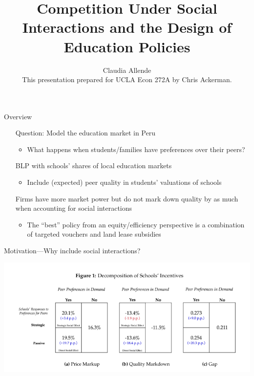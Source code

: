 \documentclass[dvipsnames]{beamer}
\title{Competition Under Social Interactions and the Design of Education Policies}
\author{Claudia Allende \\[2em] \small{This presentation prepared for UCLA Econ 272A by Chris Ackerman.}}
\begin{document}
\maketitle

\begin{frame}{Overview}
  \begin{itemize}
  \item[Question:] Model the education market in Peru 
    \begin{itemize}
    \item What happens when students/families have preferences over their peers?
    \end{itemize}
    \vitem[Approach:] BLP with schools' shares of local education markets
    \begin{itemize}
    \item Include (expected) peer quality in students' valuations of schools
    \end{itemize}
    \vitem[Results:] Firms have more market power but do not mark down quality by as much when accounting for social interactions
    \begin{itemize}
    \item The ``best'' policy from an equity/efficiency perspective is a combination of targeted vouchers and land lease subsidies
    \end{itemize}
  \end{itemize}
\end{frame}
%
\begin{frame}{Motivation---Why include social interactions?}
  \begin{center}
   \includegraphics[width=\textwidth, keepaspectratio=true]{figs/fig1.png} 
  \end{center}
\end{frame}
%
\end{document}
